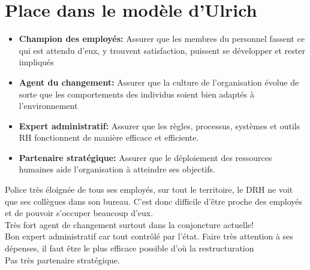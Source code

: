 \documentclass[12pt]{article}
\begin{document}
\section{Place dans le modèle d'Ulrich}

\begin{itemize}
	\item \textbf{Champion des employés:} Assurer que les membres du personnel fassent ce qui est attendu d'eux, y trouvent satisfaction, puissent se développer et rester impliqués 
	\item \textbf{Agent du changement:} Assurer que la culture de l'organisation évolue de sorte que les comportements des individus soient bien adaptés à l'environnement 
	\item \textbf{Expert administratif:} Assurer que les règles, processus, systèmes et outils RH fonctionnent de manière efficace et efficiente.
	\item \textbf{Partenaire stratégique:} Assurer que le déploiement des ressources humaines aide l'organisation à atteindre ses objectifs.
\end{itemize}


Police très éloignée de tous ses employés, sur tout le territoire, le DRH ne voit que ses collègues dans son bureau. C'est donc difficile d'être proche des employés et de pouvoir s'occuper beaucoup d'eux.\\

Très fort agent de changement surtout dans la conjoncture actuelle!\\

Bon expert administratif car tout contrôlé par l'état. Faire très attention à ses dépenses, il faut être le plus efficace possible d'où la restructuration\\


Pas très partenaire stratégique. 

\end{document}
